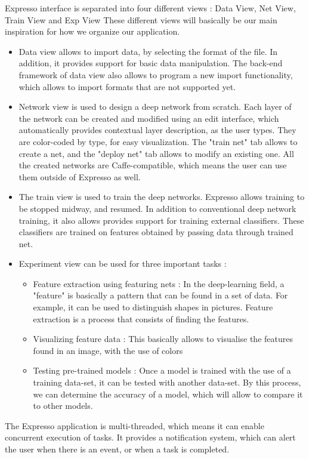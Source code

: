\noindent Expresso interface is separated into four different views : Data View, Net View, Train View and Exp View
These different views will basically be our main inspiration for how we organize our application.
\begin{itemize}
\item Data view allows to import data, by selecting the format of the file. In addition, it provides support for basic data manipulation. The back-end framework of data view also allows to program a new import functionality, which allows to import formats that are not supported yet.
\item Network view is used to design a deep network from scratch. Each layer of the network can be created and modified using an edit interface, which automatically provides contextual layer description, as the user types. They are color-coded by type, for easy visualization. The "train net" tab allows to create a net, and the "deploy net" tab allows to modify an existing one. All the created networks are Caffe-compatible, which means the user can use them outside of Expresso as well.
\item The train view is used to train the deep networks. Expresso allows training to be stopped midway, and resumed. In addition to conventional deep network training, it also allows provides support for training external classifiers. These classifiers are trained on features obtained by passing data through trained net.
\item Experiment view can be used for three important tasks :
\begin{itemize}
\item Feature extraction using featuring nets : In the deep-learning field, a "feature" is basically a pattern that can be found in a set of data. For example, it can be used to distinguish shapes in pictures. Feature extraction is a process that consists of finding the features.
\item Visualizing feature data : This basically allows to visualise the features found in an image, with the use of colors
\item Testing pre-trained models : Once a model is trained with the use of a training data-set, it can be tested with another data-set. By this process, we can determine the accuracy of a model, which will allow to compare it to other models.
\end{itemize}
\end{itemize}
The Expresso application is multi-threaded, which means it can enable concurrent execution of tasks. It provides a notification system, which can alert the user when there is an event, or when a task is completed.


